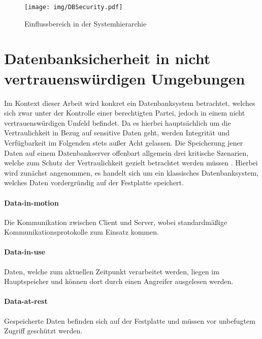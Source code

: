 \begin{figure}
	\texttt{[image: img/DBSecurity.pdf]}
	\centering
	\caption{Einflussbereich in der Systemhierarchie}
	\label{fig:dbsecurity}
\end{figure}

\section{Datenbanksicherheit in nicht vertrauenswürdigen Umgebungen}

Im Kontext dieser Arbeit wird konkret ein Datenbanksystem betrachtet, welches sich zwar unter der Kontrolle einer berechtigten Partei, jedoch in einem nicht vertrauenswürdigen Umfeld befindet. Da es hierbei hauptsächlich um die Vertraulichkeit in Bezug auf sensitive Daten geht, werden Integrität und Verfügbarkeit im Folgenden stets außer Acht gelassen. Die Speicherung jener Daten auf einem Datenbankserver offenbart allgemein drei kritische Szenarien, welche zum Schutz der Vertraulichkeit gezielt betrachtet werden müssen \cite{Shmueli2010}. Hierbei wird zunächst angenommen, es handelt sich um ein klassisches Datenbanksystem, welches Daten vordergründig auf der Festplatte speichert.

\paragraph{Data-in-motion}
Die Kommunikation zwischen Client und Server, wobei standardmäßige Kommunikationsprotokolle zum Einsatz kommen.

\paragraph{Data-in-use}
Daten, welche zum aktuellen Zeitpunkt verarbeitet werden, liegen im Hauptspeicher und können dort durch einen Angreifer ausgelesen werden.

\paragraph{Data-at-rest}
Gespeicherte Daten befinden sich auf der Festplatte und müssen vor unbefugtem Zugriff geschützt werden.

